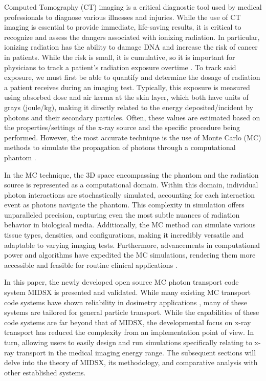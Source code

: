 \par Computed Tomography (CT) imaging is a critical diagnostic tool used by medical professionals to diagnose various illnesses and injuries. While the use of CT imaging is essential to provide immediate, life-saving results, it is critical to recognize and assess the dangers associated with ionizing radiation. In particular, ionizing radiation has the ability to damage DNA and increase the risk of cancer in patients. While the risk is small, it is cumulative, so it is important for physicians to track a patient's radiation exposure overtime \cite{lauer2009elements}. To track said exposure, we must first be able to quantify and determine the dosage of radiation a patient receives during an imaging test. Typically, this exposure is measured using absorbed dose and air kerma at the skin layer, which both have units of grays (joule/kg), making it directly related to the energy deposited/incident by photons and their secondary particles. Often, these values are estimated based on the properties/settings of the x-ray source and the specific procedure being performed. However, the most accurate technique is the use of Monte Carlo (MC) methods to simulate the propagation of photons through a computational phantom \cite{essmedphys2012}. 
\par In the MC technique, the 3D space encompassing the phantom and the radiation source is represented as a computational domain. Within this domain, individual photon interactions are stochastically simulated, accounting for each interaction event as photons navigate the phantom. This complexity in simulation offers unparalleled precision, capturing even the most subtle nuances of radiation behavior in biological media. Additionally, the MC method can simulate various tissue types, densities, and configurations, making it incredibly versatile and adaptable to varying imaging tests. Furthermore, advancements in computational power and algorithms have expedited the MC simulations, rendering them more accessible and feasible for routine clinical applications \cite{fernandez_bosman_validation_2021}.
\par In this paper, the newly developed open source MC photon transport code system MIDSX is presented and validated. While many existing MC transport code systems have shown reliability in dosimetry applications \cite{fernandez_bosman_validation_2021, geant4valid2004}, many of these systems are tailored for general particle transport. While the capabilities of these code systems are far beyond that of MIDSX, the developmental focus on x-ray transport has reduced the complexity from an implementation point of view. In turn, allowing users to easily design and run simulations specifically relating to x-ray transport in the medical imaging energy range. The subsequent sections will delve into the theory of MIDSX, its methodology, and comparative analysis with other established systems.